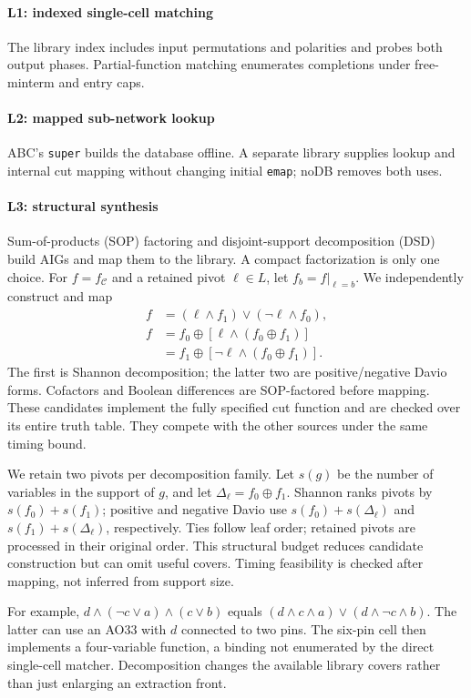 \paragraph{L1: indexed single-cell matching}
The library index includes input permutations and polarities and probes both output phases. Partial-function matching enumerates completions under free-minterm and entry caps.

\paragraph{L2: mapped sub-network lookup}
ABC's \texttt{super} builds the database offline. A separate library supplies lookup and internal cut mapping without changing initial \texttt{emap}; noDB removes both uses.

\paragraph{L3: structural synthesis}
Sum-of-products (SOP) factoring and disjoint-support decomposition (DSD) build AIGs and map them to the library. A compact factorization is only one choice. For $f=f_{\mathcal C}$ and a retained pivot $\ell\in L$, let $f_b=f|_{\ell=b}$. We independently construct and map
\begin{align}
 f&=(\ell\wedge f_1)\vee(\neg\ell\wedge f_0),\nonumber\\
 f&=f_0\oplus[\ell\wedge(f_0\oplus f_1)]\nonumber\\
  &=f_1\oplus[\neg\ell\wedge(f_0\oplus f_1)].\label{eq:decomp}
\end{align}
The first is Shannon decomposition; the latter two are positive/negative Davio forms. Cofactors and Boolean differences are SOP-factored before mapping. These candidates implement the fully specified cut function and are checked over its entire truth table. They compete with the other sources under the same timing bound.

We retain two pivots per decomposition family. Let $s(g)$ be the number of variables in the support of $g$, and let $\Delta_\ell=f_0\oplus f_1$. Shannon ranks pivots by $s(f_0)+s(f_1)$; positive and negative Davio use $s(f_0)+s(\Delta_\ell)$ and $s(f_1)+s(\Delta_\ell)$, respectively. Ties follow leaf order; retained pivots are processed in their original order. This structural budget reduces candidate construction but can omit useful covers. Timing feasibility is checked after mapping, not inferred from support size.

For example, $d\wedge(\neg c\vee a)\wedge(c\vee b)$ equals $(d\wedge c\wedge a)\vee(d\wedge\neg c\wedge b)$. The latter can use an AO33 with $d$ connected to two pins. The six-pin cell then implements a four-variable function, a binding not enumerated by the direct single-cell matcher. Decomposition changes the available library covers rather than just enlarging an extraction front.


